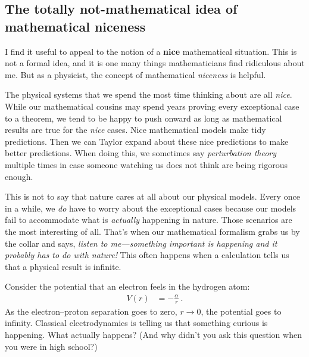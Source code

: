 \subsection{The totally not-mathematical idea  of mathematical niceness}
\label{sec:niceness}

I find it useful to appeal to the notion of a \textbf{nice} mathematical situation. This is not a formal idea, and it is one many things mathematicians find ridiculous about me. But as a physicist, the concept of mathematical \emph{niceness} is helpful. 

The physical systems that we spend the most time thinking about are all \emph{nice}. 
%
While our mathematical cousins may spend years proving every exceptional case to a theorem, we tend to be happy to push onward as long as mathematical results are true for the \emph{nice} cases. 
%
Nice mathematical models make tidy predictions. Then we can Taylor expand about these nice predictions to make better predictions.
%
When doing this, we sometimes say \emph{perturbation theory} multiple times in case someone watching us does not think are being rigorous enough.
% 
%

This is not to say that nature cares at all about our physical models. 
%
Every once in a while, we \emph{do} have to worry about the exceptional cases because our models fail to accommodate what is \emph{actually} happening in nature. Those scenarios are the most interesting of all. That’s when our mathematical formalism grabs us by the collar and says, \emph{listen to me---something important is happening and it probably has to do with nature!} This often happens when a calculation tells us that a physical result is infinite. 

\begin{exercise}\label{ex:hydrogen:problem}
Consider the potential that an electron feels in the hydrogen atom:
\begin{align}
	V(r) &= -\frac{\alpha}{r} \ .
\end{align}
As the electron--proton separation goes to zero, $r\to 0$, the potential goes to infinity. Classical electrodynamics is telling us that something curious is happening. What actually happens? (And why didn't you ask this question when you were in high school?)
\end{exercise}


